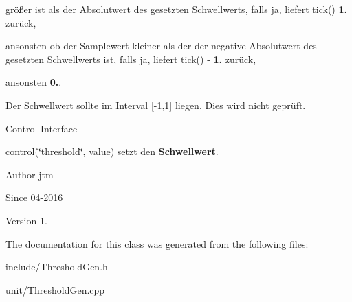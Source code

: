 \begin{DoxyItemize}
\item größer ist als der Absolutwert des gesetzten Schwellwerts, falls ja, liefert tick() {\bfseries 1.} zurück,
\item ansonsten ob der Samplewert kleiner als der der negative Absolutwert des gesetzten Schwellwerts ist, falls ja, liefert tick() -\/ {\bfseries 1.} zurück,
\item ansonsten {\bfseries 0.}.
\end{DoxyItemize}

Der Schwellwert sollte im Interval \mbox{[}-\/1,1\mbox{]} liegen. Dies wird nicht geprüft.

Control-\/\-Interface


\begin{DoxyItemize}
\item control(\char`\"{}threshold\char`\"{}, value) setzt den {\bfseries Schwellwert}.
\end{DoxyItemize}

\begin{DoxyAuthor}{Author}
jtm 
\end{DoxyAuthor}
\begin{DoxySince}{Since}
04-\/2016 
\end{DoxySince}
\begin{DoxyVersion}{Version}
1. 
\end{DoxyVersion}


The documentation for this class was generated from the following files\-:\begin{DoxyCompactItemize}
\item 
include/Threshold\-Gen.\-h\item 
unit/Threshold\-Gen.\-cpp\end{DoxyCompactItemize}
